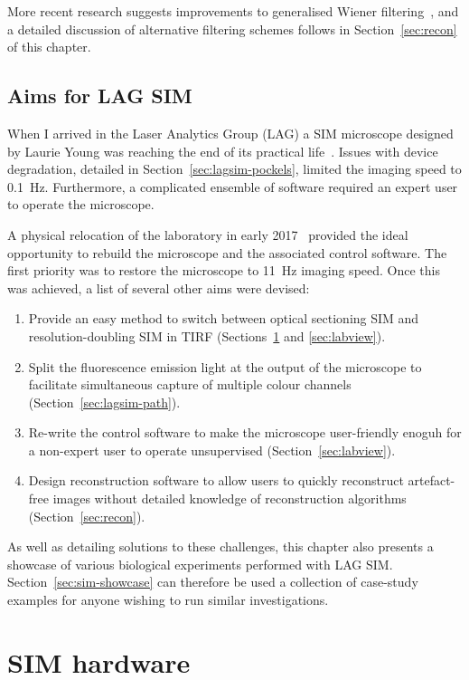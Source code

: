 More recent research suggests improvements to generalised Wiener filtering~\cite{righolt2013image, perez2016optimal, chakrova2016deconvolution}, and a detailed discussion of alternative filtering schemes follows in Section~\ref{sec:recon} of this chapter. 


\subsection{Aims for LAG SIM}
When I arrived in the Laser Analytics Group (LAG) a SIM microscope designed by Laurie Young was reaching the end of its practical life~\cite{young2016guide}.
Issues with device degradation, detailed in Section~\ref{sec:lagsim-pockels}, limited the imaging speed to \SI{0.1}{\hertz}.
Furthermore, a complicated ensemble of software required an expert user to operate the microscope.

A physical relocation of the laboratory in early 2017~\cite{newbuilding} provided the ideal opportunity to rebuild the microscope and the associated control software. The first priority was to restore the microscope to \SI{11}{\hertz} imaging speed. Once this was achieved, a list of several other aims were devised: 
\begin{enumerate}
	\item Provide an easy method to switch between optical sectioning SIM and resolution-doubling SIM in TIRF (Sections~\ref{sec:hardware} and \ref{sec:labview}). 
	\item Split the fluorescence emission light at the output of the microscope to facilitate simultaneous capture of multiple colour channels (Section~\ref{sec:lagsim-path}). 
	\item Re-write the control software to make the microscope user-friendly enoguh for a non-expert user to operate unsupervised (Section~\ref{sec:labview}).
	\item Design reconstruction software to allow users to quickly reconstruct artefact-free images without detailed knowledge of reconstruction algorithms (Section~\ref{sec:recon}). 
\end{enumerate}

As well as detailing solutions to these challenges, this chapter also presents a showcase of various biological experiments performed with LAG SIM. 
Section~\ref{sec:sim-showcase} can therefore be used a collection of case-study examples for anyone wishing to run similar investigations. 

\section{SIM hardware} \label{sec:hardware}
